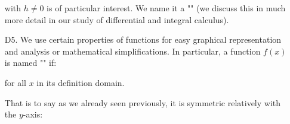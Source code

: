 \begin{enumerate}
		with $h\neq 0$ is of particular interest. We name it a "" (we discuss this in much more detail in our study of differential and integral calculus).
		
		\item[D5.] We use certain properties of functions for easy graphical representation and analysis or mathematical simplifications. In particular, a function $f (x)$ is named "\label{even function}" if:
		
		for all $x$ in its definition domain.
		
		That is to say as we already seen previously, it is symmetric relatively with the $y$-axis:
		\begin{figure}[H]
			\centering
			\begin{tikzpicture}[x=0.75pt,y=0.75pt,yscale=-1,xscale=1]
			

\end{tikzpicture}
\end{figure}
\end{enumerate}
